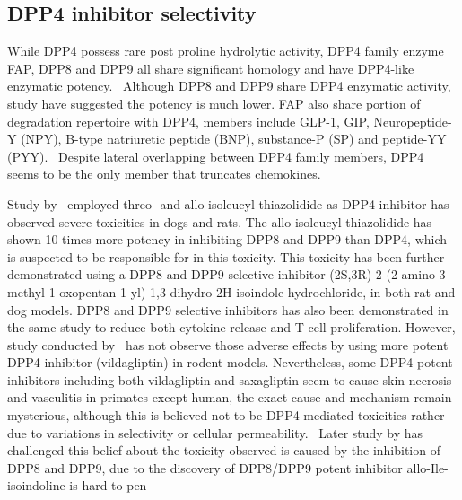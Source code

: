 \subsection{DPP4 inhibitor selectivity}
While DPP4 possess rare post proline hydrolytic activity, DPP4 family enzyme FAP, DPP8 and DPP9 all share significant homology and have DPP4-like enzymatic potency.~\cite{Kirby_2010,Thornberry_2007} Although DPP8 and DPP9 share DPP4 enzymatic activity, study have suggested the potency is much lower. FAP also share portion of degradation repertoire with DPP4, members include GLP-1, GIP, Neuropeptide-Y (NPY), B-type natriuretic peptide (BNP), substance-P (SP) and peptide-YY (PYY).~\cite{Keane_2011} Despite lateral overlapping between DPP4 family members, DPP4 seems to be the only member that truncates chemokines.~\cite{Keane_2011}  
\par 
Study by~\citet{Lankas2005} employed threo- and allo-isoleucyl thiazolidide as DPP4 inhibitor has observed severe toxicities in dogs and rats. The allo-isoleucyl thiazolidide has shown 10 times more potency in inhibiting DPP8 and DPP9 than DPP4, which is suspected to be responsible for in this toxicity. This toxicity has been further demonstrated using a DPP8 and DPP9 selective inhibitor (2S,3R)-2-(2-amino-3-methyl-1-oxopentan-1-yl)-1,3-dihydro-2H-isoindole hydrochloride, in both rat and dog models. DPP8 and DPP9 selective inhibitors has also been demonstrated in the same study to reduce both cytokine release and T cell proliferation. However, study conducted by~\citet{Burkey2008} has not observe those adverse effects by using more potent DPP4 inhibitor (vildagliptin) in rodent models. Nevertheless, some DPP4 potent inhibitors including both vildagliptin and saxagliptin seem to cause skin necrosis and vasculitis in primates except human, the exact cause and mechanism remain mysterious, although this is believed not to be DPP4-mediated toxicities rather due to variations in selectivity or cellular permeability.~\cite{Hoffmann2014} Later study by \citet{Bank2011} has challenged this belief about the toxicity observed is caused by the inhibition of DPP8 and DPP9, due to the discovery of DPP8/DPP9 potent inhibitor allo-Ile-isoindoline is hard to pen 
\par 